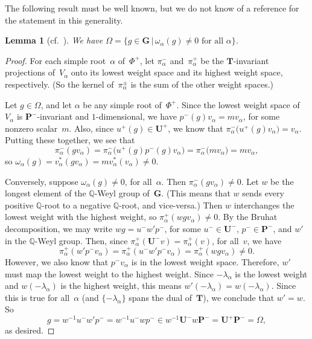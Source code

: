\documentclass[11pt]{article}
\numberwithin{equation}{section}
\newcommand{\QQ}{\mathbb{Q}}
\newcommand{\Ga}{\mathbf{G}}
\newcommand{\Pa}{\mathbf{P}}
\newcommand{\Ta}{\mathbf{T}}
\newcommand{\Ua}{\mathbf{U}}
\numberwithin{equation}{section}
\newtheorem{lem}[thm]{Lemma}
\theoremstyle{definition}
\begin{document}
The following result must be well known, but we do not know of a reference for the statement in this generality.

\begin{lem}[cf.\ {\cite[Lemma~4.11(i)]{MR1828742}}] \label{OmegaIdeal}
We have $\Omega = \{ g \in \Ga \,|\, \text{$\omega_\alpha(g) \neq 0$ for all~$\alpha$} \} $.
\end{lem}

\begin{proof}
For each simple root~$\alpha$ of~$\Phi^+$, let $\pi^-_\alpha$ and~$\pi^+_\alpha$ be the $\Ta$-invariant projections of~$V_\alpha$ onto its lowest weight space and its highest weight space, respectively. (So the kernel of~$\pi^\pm_\alpha$ is the sum of the other weight spaces.)

Let $g \in \Omega$, and let $\alpha$ be any simple root of~$\Phi^+$. Since the lowest weight space of~$V_\alpha$ is $\Pa^-$-invariant and $1$-dimensional, we have $p^-(g) v_\alpha = m v_\alpha$, for some nonzero scalar~$m$. Also, since $u^+(g) \in \Ua^+$, we know that $\pi^-_\alpha \bigl( u^+(g) v_\alpha \bigr) = v_\alpha$. Putting these together, we see that
	\[ \pi^-_\alpha(gv_\alpha)
	= \pi^-_\alpha \bigl( u^+(g) p^-(g) v_\alpha \bigr)
	= \pi^-_\alpha \bigl( m v_\alpha \bigr)
	= m v_\alpha, \]
so $\omega_\alpha(g) = v_\alpha^*( g v_\alpha) = m v_\alpha^*( v_\alpha) \neq 0$.

Conversely, suppose $\omega_\alpha(g) \neq 0$, for all~$\alpha$.
Then $\pi^-_\alpha(g v_\alpha) \neq 0$.
Let $w$ be the longest element of the $\QQ$-Weyl group of~$\Ga$. (This means that $w$ sends every positive $\QQ$-root to a negative $\QQ$-root, and vice-versa.)
Then $w$ interchanges the lowest weight with the highest weight, so $\pi^+_\alpha(w g v_\alpha) \neq 0$.
By the Bruhat decomposition, we may write $w g = u^- w' p^-$, for some $u^- \in \Ua^-$, $p^- \in \Pa^-$, and $w'$ in the $\QQ$-Weyl group.
Then, since $\pi^+_\alpha(\Ua^- v) = \pi^+_\alpha(v)$, for all~$v$, we have
\[ \pi^+_\alpha(w' p^- v_\alpha)= \pi^+_\alpha(u^- w' p^- v_\alpha)= \pi^+_\alpha(w g v_\alpha)	\neq 0.
\]
However, we also know that $p^- v_\alpha$ is in the lowest weight space. Therefore, $w'$ must map the lowest weight to the highest weight. Since $-\lambda_\alpha$ is the lowest weight and $w(-\lambda_\alpha)$ is the highest weight, this means $w'(-\lambda_\alpha) = w(-\lambda_\alpha)$. Since this is true for all~$\alpha$ (and $\{-\lambda_\alpha\}$ spans the dual of~$\Ta$), we conclude that $w' = w$. So
	\[ g
	= w^{-1} u^- w' p^-
	= w^{-1} u^- w p^-
	\in w^{-1} \Ua^- w \Pa^-
	= \Ua^+ \Pa^-
	= \Omega
	, \]
as desired.
\end{proof}
\end{document}
